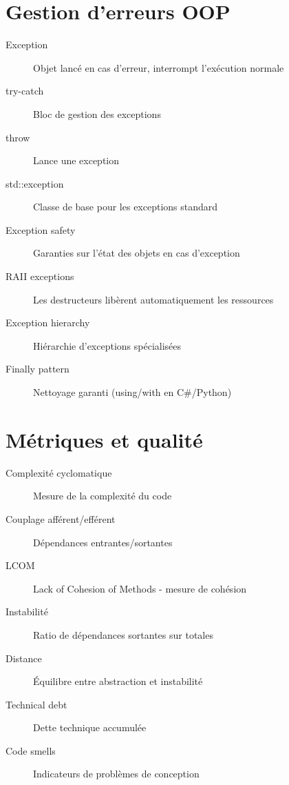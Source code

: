 \documentclass{article}
\begin{document}
\begin{multicols*}{3}
\section*{Gestion d'erreurs OOP}
\begin{description}
\item[Exception] Objet lancé en cas d'erreur, interrompt l'exécution normale
\item[try-catch] Bloc de gestion des exceptions
\item[throw] Lance une exception
\item[std::exception] Classe de base pour les exceptions standard
\item[Exception safety] Garanties sur l'état des objets en cas d'exception
\item[RAII exceptions] Les destructeurs libèrent automatiquement les ressources
\item[Exception hierarchy] Hiérarchie d'exceptions spécialisées
\item[Finally pattern] Nettoyage garanti (using/with en C\#/Python)
\end{description}

\section*{Métriques et qualité}
\begin{description}
\item[Complexité cyclomatique] Mesure de la complexité du code
\item[Couplage afférent/efférent] Dépendances entrantes/sortantes
\item[LCOM] Lack of Cohesion of Methods - mesure de cohésion
\item[Instabilité] Ratio de dépendances sortantes sur totales
\item[Distance] Équilibre entre abstraction et instabilité
\item[Technical debt] Dette technique accumulée
\item[Code smells] Indicateurs de problèmes de conception
\end{description}


\end{multicols*}
\end{document}
